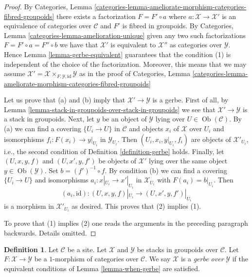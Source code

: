 \documentclass{stacks-project}
\theoremstyle{plain}
\theoremstyle{definition}
\newtheorem{definition}[subsection]{Definition}
\theoremstyle{remark}
\numberwithin{equation}{subsection}
\def\Ob{\mathop{\mathrm{Ob}}\nolimits}
\begin{document}
\begin{proof}
By
Categories, Lemma
\ref{categories-lemma-ameliorate-morphism-categories-fibred-groupoids}
there exists a factorization $F = F' \circ a$ where
$a : \mathcal{X} \to \mathcal{X}'$ is an equivalence of categories over
$\mathcal{C}$ and $F'$ is fibred in groupoids. By
Categories, Lemma \ref{categories-lemma-amelioration-unique}
given any two such factorizations $F = F' \circ a = F'' \circ b$
we have that $\mathcal{X}'$ is equivalent to $\mathcal{X}''$ as
categories over $\mathcal{Y}$. Hence
Lemma \ref{lemma-gerbe-equivalent}
guarantees that the condition (1) is independent of the choice of the
factorization. Moreover, this means that we may assume
$\mathcal{X}' = \mathcal{X} \times_{F, \mathcal{Y}, \text{id}} \mathcal{Y}$
as in the proof of
Categories, Lemma
\ref{categories-lemma-ameliorate-morphism-categories-fibred-groupoids}

\medskip\noindent
Let us prove that (a) and (b) imply that $\mathcal{X}' \to \mathcal{Y}$
is a gerbe. First of all, by
Lemma \ref{lemma-stack-in-groupoids-over-stack-in-groupoids}
we see that $\mathcal{X}' \to \mathcal{Y}$ is a stack in groupoids.
Next, let $y$ be an object of $\mathcal{Y}$ lying over
$U \in \Ob(\mathcal{C})$. By (a) we can find a covering
$\{U_i \to U\}$ in $\mathcal{C}$ and objects $x_i$ of $\mathcal{X}$
over $U_i$ and isomorphisms $f_i : F(x_i) \to y|_{U_i}$ in
$\mathcal{Y}_{U_i}$. Then $(U_i, x_i, y|_{U_i}, f_i)$ are objects
of $\mathcal{X}'_{U_i}$, i.e., the second condition of
Definition \ref{definition-gerbe}
holds. Finally, let $(U, x, y, f)$ and $(U, x', y, f')$ be objects
of $\mathcal{X}'$ lying over the same object $y \in \Ob(\mathcal{Y})$.
Set $b = (f')^{-1} \circ f$. By condition (b) we can find a covering
$\{U_i \to U\}$ and isomorphisms $a_i : x|_{U_i} \to x'|_{U_i}$
in $\mathcal{X}_{U_i}$ with $F(a_i) = b|_{U_i}$. Then
$$
(a_i, \text{id}) : (U, x, y, f)|_{U_i} \to (U, x', y, f')|_{U_i}
$$
is a morphism in $\mathcal{X}'_{U_i}$ as desired. This proves that
(2) implies (1).

\medskip\noindent
To prove that (1) implies (2) one reads the arguments
in the preceding paragraph backwards. Details omitted.
\end{proof}

\begin{definition}
\label{definition-gerbe-over-stack-in-groupoids}
Let $\mathcal{C}$ be a site. Let $\mathcal{X}$
and $\mathcal{Y}$ be stacks in groupoids over $\mathcal{C}$.
Let $F : \mathcal{X} \to \mathcal{Y}$ be a $1$-morphism of categories
over $\mathcal{C}$. We say $\mathcal{X}$ is a {\it gerbe over} $\mathcal{Y}$
if the equivalent conditions of
Lemma \ref{lemma-when-gerbe}
are satisfied.
\end{definition}
\end{document}
